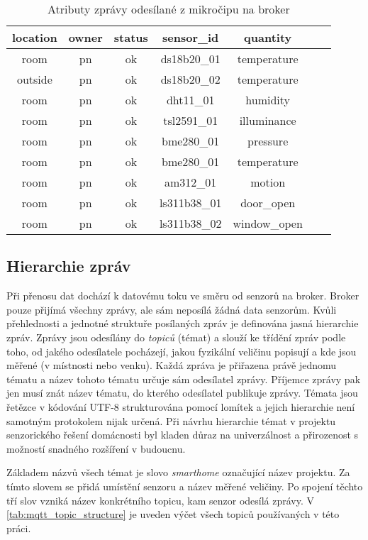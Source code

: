 \begin{table}[h]
\centering
 \begin{tabular}{|c|c|c|c|c|c|c|} 
 \hline
  location & owner & status\footnotemark & sensor\_id & quantity  \\
 \hline\hline
 room & pn & ok & ds18b20\_01 & temperature \\ 
 outside & pn & ok & ds18b20\_02 & temperature \\
 room & pn & ok & dht11\_01 & humidity \\
 room & pn & ok & tsl2591\_01 & illuminance \\
 room & pn & ok & bme280\_01 & pressure \\
 room & pn & ok & bme280\_01 & temperature \\
 room & pn & ok & am312\_01 & motion \\
 room & pn & ok & ls311b38\_01 & door\_open \\
 room & pn & ok & ls311b38\_02 & window\_open \\
 \hline
 \end{tabular}
 \caption{Atributy zprávy odesílané z mikročipu na broker}
 \label{tab:mqtt_msg_structure}
\end{table}


\subsection{Hierarchie zpráv} \label{subsec:message_hierarchy}
Při přenosu dat dochází k datovému toku ve směru od senzorů na broker. Broker pouze přijímá všechny zprávy, ale sám neposílá žádná data senzorům. Kvůli přehlednosti a jednotné struktuře posílaných zpráv je definována jasná hierarchie zpráv. Zprávy jsou odesílány do \textit{topiců} (témat) a slouží ke třídění zpráv podle toho, od jakého odesílatele pocházejí, jakou fyzikální veličinu popisují a kde jsou měřené (v místnosti nebo venku). Každá zpráva je přiřazena právě jednomu tématu a název tohoto tématu určuje sám odesílatel zprávy. Příjemce zprávy pak jen musí znát název tématu, do kterého odesílatel publikuje zprávy. Témata jsou řetězce v kódování UTF-8 strukturována pomocí lomítek a jejich hierarchie není samotným protokolem nijak určená. Při návrhu hierarchie témat v projektu senzorického řešení domácnosti byl kladen důraz na univerzálnost a přirozenost s možností snadného rozšíření v budoucnu. \par
Základem názvů všech témat je slovo \textit{smarthome} označující název projektu. Za tímto slovem se přidá umístění senzoru a název měřené veličiny. Po spojení těchto tří slov vzniká název konkrétního topicu, kam senzor odesílá zprávy. V \cref{tab:mqtt_topic_structure} je uveden výčet všech topiců používaných v této práci.

